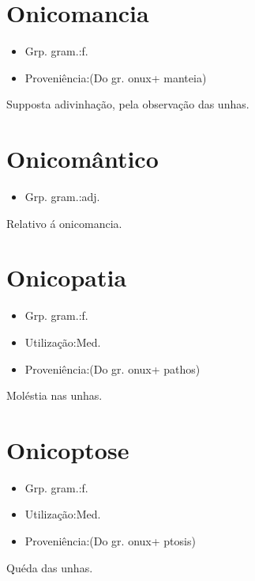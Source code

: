 \section{Onicomancia}
\begin{itemize}
\item {Grp. gram.:f.}
\end{itemize}
\begin{itemize}
\item {Proveniência:(Do gr. \textunderscore onux\textunderscore  + \textunderscore manteia\textunderscore )}
\end{itemize}
Supposta adivinhação, pela observação das unhas.
\section{Onicomântico}
\begin{itemize}
\item {Grp. gram.:adj.}
\end{itemize}
Relativo á \textunderscore onicomancia\textunderscore .
\section{Onicopatia}
\begin{itemize}
\item {Grp. gram.:f.}
\end{itemize}
\begin{itemize}
\item {Utilização:Med.}
\end{itemize}
\begin{itemize}
\item {Proveniência:(Do gr. \textunderscore onux\textunderscore  + \textunderscore pathos\textunderscore )}
\end{itemize}
Moléstia nas unhas.
\section{Onicoptose}
\begin{itemize}
\item {Grp. gram.:f.}
\end{itemize}
\begin{itemize}
\item {Utilização:Med.}
\end{itemize}
\begin{itemize}
\item {Proveniência:(Do gr. \textunderscore onux\textunderscore  + \textunderscore ptosis\textunderscore )}
\end{itemize}
Quéda das unhas.
